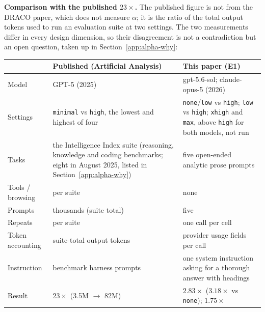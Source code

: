 \documentclass[11pt]{article}
\begin{document}
\textbf{Comparison with the published $23\times$.} The published figure
\citep{aagpt5benchmarks2025} is not from the DRACO paper, which does not measure $\alpha$; it
is the ratio of the total output tokens used to run an evaluation suite at two settings. The two
measurements differ in every design dimension, so their disagreement is not a
contradiction but an open question, taken up in Section~\ref{app:alpha-why}:
\begin{center}
\small
\begin{tabular}{p{3.2cm}>{\raggedright\arraybackslash}p{5.6cm}>{\raggedright\arraybackslash}p{5.6cm}}
\toprule
 & Published (Artificial Analysis) & This paper (E1) \\
\midrule
Model & GPT-5 (2025) & gpt-5.6-sol; claude-opus-5 (2026) \\
Settings & \texttt{minimal} vs \texttt{high}, the lowest and highest of four & \texttt{none}/\texttt{low} vs \texttt{high}; \texttt{low} vs \texttt{high}; \texttt{xhigh} and \texttt{max}, above \texttt{high} for both models, not run \\
Tasks & the Intelligence Index suite (reasoning, knowledge and coding benchmarks; eight in August 2025, listed in Section~\ref{app:alpha-why}) & five open-ended analytic prose prompts \\
Tools / browsing & per suite & none \\
Prompts & thousands (suite total) & five \\
Repeats & per suite & one call per cell \\
Token accounting & suite-total output tokens & provider usage fields per call \\
Instruction & benchmark harness prompts & one system instruction asking for a thorough answer with headings \\
Result & $23\times$ (3.5M $\to$ 82M) & $2.83\times$ ($3.18\times$ vs \texttt{none}); $1.75\times$ \\
\bottomrule
\end{tabular}
\end{center}
\end{document}
